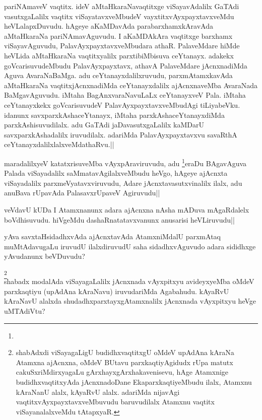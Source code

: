 \begin{artha}
{pariNAmaveV vaqtitx. ideV aMtaHkaraNavaqtitxge viSayavAdalilx GaTAdi 
vasutxgaLalilx vaqtitx viSayatavxveMbudeV vayxtitxvAyxpayxtavxveMdu 
heVLalapxDuvudu. hAgeye aKaMDavAda parabarxhamxkAravAda aMtaHkaraNa 
pariNAmavAguvudu. I aKaMDAkAra vaqtitxge barxhamx viSayavAguvudu, 
PalavAyxpayxtavxveMbudara athaR. PalaveMdare hiMde heVLida aMtaHkaraNa 
vaqtitxyalilx parxtibiMbisuva ceYtanayx. adakekx goVcarisuvudeMbudu 
PalavAyxpayxtavx, athavA PalaveMdare jAcnxnadiMda Aguva AvaraNaBaMga. 
adu ceYtanayxdalilxruvudu, parxmAtamxkavAda aMtaHkaraNa 
vaqtitxjAcnxnadiMda ceYtanayxdalilx ajAcnxnaveMba AvaraNada 
BaMgavAguvudu. iMtaha BagAnxvaraNavuLaLx ceYtanayxveV Pala. iMtaha 
ceYtanayxkekx goVcarisuvudeV PalavAyxpayxtavxveMbudAgi tiLiyabeVku. 
idanunx savxparxkAshaceYtanayx, iMtaha parxkAshaceYtanayxdiMda 
parxkAshisuvudilalx. adu GaTAdi jaDavasutxgaLalilx kaMDarU 
savxparxkAshadalilx iruvudilalx. adariMda PalavAyxpayxtavxvu savaRthA 
ceYtanayxdalilxlalxveMdathaRvu.}||
\end{artha}

\begin{artha} 
maradalilxyeV katatxrisuveMba vAyxpAraviruvudu, adu 
\footnote[2]{}eraDu BAgavAguva Palada viSayadalilx 
saMmatavAgilalxveMbudu heVgo, hAgeye ajAcnxta viSayadalilx 
parxmeVyatavxviruvudu, Adare jAcnxtavasutxvinalilx ilalx, adu anuBava 
rUpavAda PalasavxrUpaveV Agiruvudu||
\end{artha}

\begin{artha} 
veVdavU kUDa I Atamxnanunx adara ajAcnxna nAsha mADuva mAgaRdalelx 
boVdhisuvudu. hiVgeMdu dashaRnatatavxvanunx anusarisi heVLiruvudu||
\end{artha}

\begin{artha} 
yAva savxtaHsidadhxvAda ajAcnxtavAda AtamxniMdalU parxmAtaq 
muMtAdavugaLu iruvudU ilalxdiruvudU saha sidadhxvAguvudo adara 
sididhxge yAvudanunx beVDuvudu?  
\end{artha}


\begin{artha} 
\footnote[1]{shabAdxdi viSayagaLigU budidhxvaqtitxgU oMdeV upAdAna 
kAraNa Atamxna ajAcnxna, oMdeV BUtavu parxkaqtiyAgidudx rUpa matutx 
cakuSxriMdirxyagaLu gArxhayxgArxhakavenisevu, hAge Atamxnige 
budidhxvaqtitxyAda jAcnxnadoDane EkaparxkaqtiyeMbudu ilalx, Atamxnu 
kAraNanU alalx, kAyaRvU alalx. adariMda nijavAgi 
vaqtitxvAyxpayxtavxveMbuvudu baruvudilalx Atamxnu vaqtitx 
viSayanalalxveMdu tAtapxyaR.}\\
shabadx modalAda viSayagaLalilx jAcnxnada vAyxpitxyu avideyxyeMba 
oMdeV parxkaqtiyu (upAdAna kAraNavu) iruvudariMda Agabahudu. kAyaRvU 
kAraNavU alalxda shudadhxparxtayxgAtamxnalilx jAcnxnada vAyxpitxyu 
heVge uMTAdiVtu?
\end{artha}

